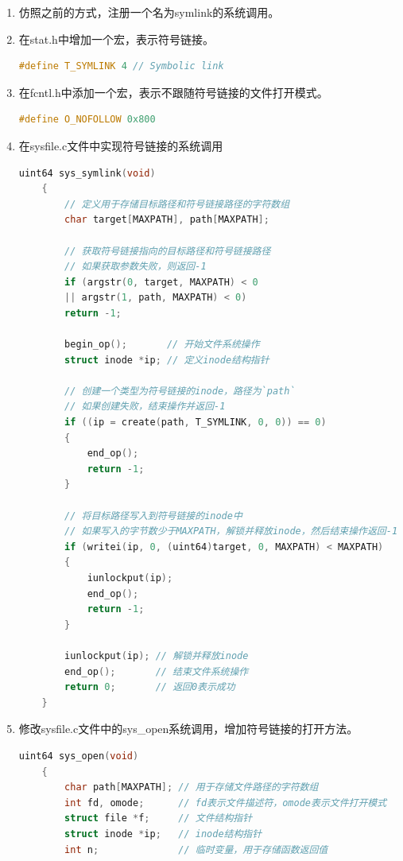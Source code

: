 \begin{enumerate}
    \item 仿照之前的方式，注册一个名为symlink的系统调用。
    \item 在stat.h中增加一个宏，表示符号链接。
          \begin{lstlisting}[language=c,title=添加表示符号链接的文件类型]
    #define T_SYMLINK 4 // Symbolic link    
    \end{lstlisting}
    \item 在fcntl.h中添加一个宏，表示不跟随符号链接的文件打开模式。
          \begin{lstlisting}[language=c,title=添加不跟随符号链接的文件打开模式的宏]
    #define O_NOFOLLOW 0x800
    \end{lstlisting}
    \item 在sysfile.c文件中实现符号链接的系统调用
          \begin{lstlisting}[language=c,title=sys\_symlink的实现]
    uint64 sys_symlink(void)
    {
        // 定义用于存储目标路径和符号链接路径的字符数组
        char target[MAXPATH], path[MAXPATH]; 
    
        // 获取符号链接指向的目标路径和符号链接路径
        // 如果获取参数失败，则返回-1
        if (argstr(0, target, MAXPATH) < 0 
        || argstr(1, path, MAXPATH) < 0)
        return -1;
    
        begin_op();       // 开始文件系统操作
        struct inode *ip; // 定义inode结构指针
    
        // 创建一个类型为符号链接的inode，路径为`path`
        // 如果创建失败，结束操作并返回-1
        if ((ip = create(path, T_SYMLINK, 0, 0)) == 0)
        {
            end_op();
            return -1;
        }
    
        // 将目标路径写入到符号链接的inode中
        // 如果写入的字节数少于MAXPATH，解锁并释放inode，然后结束操作返回-1
        if (writei(ip, 0, (uint64)target, 0, MAXPATH) < MAXPATH)
        {
            iunlockput(ip);
            end_op();
            return -1;
        }
    
        iunlockput(ip); // 解锁并释放inode
        end_op();       // 结束文件系统操作
        return 0;       // 返回0表示成功
    }    
    \end{lstlisting}
    \item 修改sysfile.c文件中的sys\_open系统调用，增加符号链接的打开方法。
          \begin{lstlisting}[language=c,title=对sys\_open函数的修改]
    uint64 sys_open(void)
    {
        char path[MAXPATH]; // 用于存储文件路径的字符数组
        int fd, omode;      // fd表示文件描述符，omode表示文件打开模式
        struct file *f;     // 文件结构指针
        struct inode *ip;   // inode结构指针
        int n;              // 临时变量，用于存储函数返回值
    

\end{lstlisting}
\end{enumerate}
